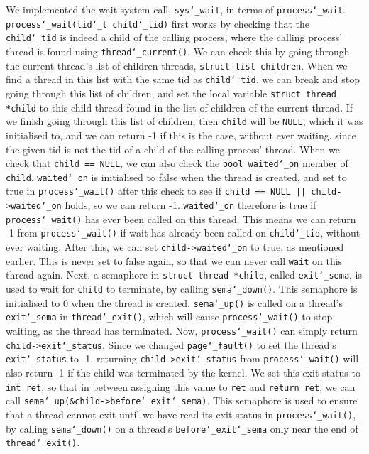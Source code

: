 \documentclass{article}
\renewcommand{\_}{\char`_}
\begin{document}
We implemented the wait system call, \texttt{sys\_wait}, in terms of \texttt{process\_wait}. \texttt{process\_wait(tid\_t child\_tid)} first works by checking that the \texttt{child\_tid} is indeed a child of the calling process, where the calling process' thread is found using \texttt{thread\_current()}. We can check this by going through the current thread's list of children threads, \texttt{struct list children}. When we find a thread in this list with the same tid as \texttt{child\_tid}, we can break and stop going through this list of children, and set the local variable \texttt{struct thread *child} to this child thread found in the list of children of the current thread. If we finish going through this list of children, then \texttt{child} will be \texttt{NULL}, which it was initialised to, and we can return -1 if this is the case, without ever waiting, since the given tid is not the tid of a child of the calling process' thread. When we check that \texttt{child == NULL}, we can also check the \texttt{bool waited\_on} member of \texttt{child}. \texttt{waited\_on} is initialised to false when the thread is created, and set to true in \texttt{process\_wait()} after this check to see if \texttt{child == NULL || child->waited\_on} holds, so we can return -1. \texttt{waited\_on} therefore is true if \texttt{process\_wait()} has ever been called on this thread. This means we can return -1 from \texttt{process\_wait()} if wait has already been called on \texttt{child\_tid}, without ever waiting. After this, we can set \texttt{child->waited\_on} to true, as mentioned earlier. This is never set to false again, so that we can never call \texttt{wait} on this thread again. Next, a semaphore in \texttt{struct thread *child}, called \texttt{exit\_sema}, is used to wait for \texttt{child} to terminate, by calling \texttt{sema\_down()}. This semaphore is initialised to 0 when the thread is created. \texttt{sema\_up()} is called on a thread's \texttt{exit\_sema} in \texttt{thread\_exit()}, which will cause \texttt{process\_wait()} to stop waiting, as the thread has terminated. Now, \texttt{process\_wait()} can simply return \texttt{child->exit\_status}. Since we changed \texttt{page\_fault()} to set the thread's \texttt{exit\_status} to -1, returning \texttt{child->exit\_status} from \texttt{process\_wait()} will also return -1 if the child was terminated by the kernel. We set this exit status to \texttt{int ret}, so that in between assigning this value to \texttt{ret} and \texttt{return ret}, we can call \texttt{sema\_up(\&child->before\_exit\_sema)}. This semaphore is used to ensure that a thread cannot exit until we have read its exit status in \texttt{process\_wait()}, by calling \texttt{sema\_down()} on a thread's \texttt{before\_exit\_sema} only near the end of \texttt{thread\_exit()}.
\end{document}
